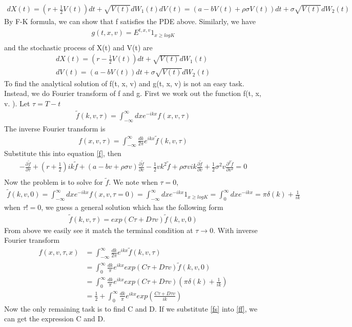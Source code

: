 \documentclass[a4paper]{article}
\begin{document}
\begin{align*}
	dX(t) = (r+\frac{1}{2}V(t))dt + \sqrt{V(t)}dW_1(t)
	dV(t) = (a-bV(t)+ \rho \sigma V(t))dt + \sigma \sqrt{V(t)}dW_2(t)
\end{align*}
By F-K formula, we can show that f satisfies the PDE above. Similarly, we have
\begin{align*}
	g(t, x, v) = E^{t,x,v} 1_{x\geq logK}\\
\end{align*}
and the stochastic process of X(t) and V(t) are
\begin{align*}
	dX(t) = (r-\frac{1}{2}V(t))dt + \sqrt{V(t)}dW_1(t)\\
	dV(t) = (a-bV(t))dt + \sigma \sqrt{V(t)}dW_2(t)
\end{align*}
To find the analytical solution of f(t, x, v) and g(t, x, v) is not an easy task. Instead, we do Fourier transform of f and g. 
First we work out the function f(t, x, v. ). Let $\tau = T-t$
\begin{align*}
	\tilde f(k, v, \tau) = \int_{-\infty}^{\infty}dx e^{-ikx}f(x, v, \tau)
\end{align*}
The inverse Fourier transform is
\begin{align*}
	f(x, v, \tau) = \int_{-\infty}^{\infty}\frac{dk}{2\pi} e^{ikx}
	\tilde f(k, v, \tau)
\end{align*}
Substitute this into equation \ref{f}, then
\begin{align} \label{ff}
	-\frac{\partial \tilde f}{\partial \tau}
	+ (r + \frac{1}{2})ik \tilde f 
	+ (a-bv+\rho \sigma v)\frac{\partial \tilde f}{\partial v}
        -\frac{1}{2}vk^2 \tilde f 
	+ \rho \sigma v ik \frac{\partial \tilde f}{\partial v}
        +\frac{1}{2} \sigma^2 v \frac{\partial^2 \tilde f}{\partial v^2}  = 0\\
\end{align}
Now the problem is to solve for $\tilde f$. We note when $\tau=0$,
\begin{align*}
	\tilde f(k, v, 0) = \int_{-\infty}^{\infty}dx e^{-ikx}f(x, v, \tau=0)
			  = \int_{-\infty}^{\infty}dx e^{-ikx}1_{x \geq logK}
			     = \int_{0}^{\infty}dx e^{-ikx}
			     = \pi \delta(k) + \frac{1}{ik}
\end{align*}
when $\tau!=0$, we guess a general solution which has the following form
\begin{align*}
	\tilde f(k, v, \tau) = exp(C\tau +D\tau v) \tilde f(k,v,0)
\end{align*}
From above we easily see it match the terminal condition at $\tau \to 0$. With inverse Fourier transform
\begin{align} \label{fs}
	f(x, v, \tau, x) & = \int_{-\infty}^{\infty}\frac{dk}{2\pi} e^{ikx} \tilde f(k, v, \tau)\\
			 & = \int_{0}^{\infty}\frac{dk}{\pi} e^{ikx} exp(C\tau + D\tau v) \tilde f(k, v, 0)\\
			 & = \int_{0}^{\infty}\frac{dk}{\pi} e^{ikx} exp(C\tau + D\tau v) 
			 	(\pi \delta(k) + \frac{1}{ik}) \\
			 & = \frac{1}{2} + \int_{0}^{\infty}\frac{dk}{\pi} e^{ikx} exp(\frac{C\tau + D\tau v}{ik}) 
\end{align}
Now the only remaining task is to find C and D. If we substitute \ref{fs} into \ref{ff}, we can get the expression C and D. 
\end{document}
